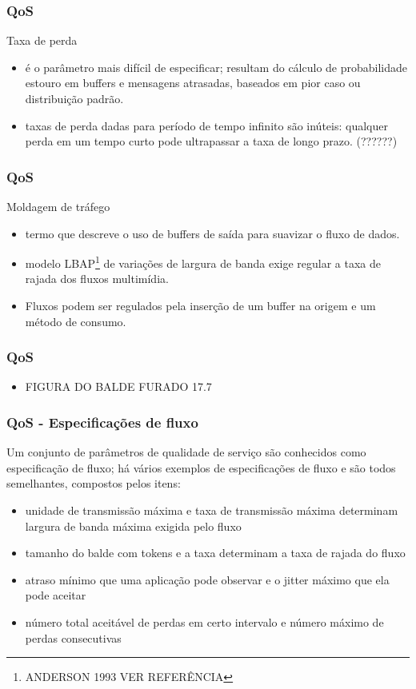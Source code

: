 \documentclass[]{beamer}
\begin{document}
\begin{frame}
  \frametitle{QoS}
Taxa de perda
\begin{itemize}
  \item é o parâmetro mais difícil de especificar; resultam do cálculo de probabilidade 
estouro em buffers e mensagens atrasadas, baseados em pior caso ou distribuição padrão.
  \item taxas de perda dadas para período de tempo infinito são inúteis: qualquer perda
em um tempo curto pode ultrapassar a taxa de longo prazo. (??????)
\end{itemize}
\end{frame}

\begin{frame}
  \frametitle{QoS}
Moldagem de tráfego
\begin{itemize}
  \item termo que descreve o uso de buffers de saída para suavizar o fluxo de dados.
  \item modelo LBAP\footnote{ANDERSON 1993 VER REFERÊNCIA} de variações de largura de banda 
exige regular a taxa de rajada dos fluxos multimídia.
  \item Fluxos podem ser regulados pela inserção de um buffer na origem e um método de 
consumo.
\end{itemize}
\end{frame}

\begin{frame}
  \frametitle{QoS}
\begin{itemize}
  \item FIGURA DO BALDE FURADO 17.7
\end{itemize}
\end{frame}

\begin{frame}
  \frametitle{QoS - Especificações de fluxo}
 Um conjunto de parâmetros de qualidade de serviço são conhecidos 
como especificação de fluxo; há vários exemplos de especificações de fluxo
e são todos semelhantes, compostos pelos itens:
  \begin{itemize}
   \item unidade de transmissão máxima e taxa de transmissão máxima determinam largura de 
banda máxima exigida pelo fluxo
   \item tamanho do balde com tokens e a taxa determinam a taxa de rajada do fluxo
   \item atraso mínimo que uma aplicação pode observar e o jitter máximo que ela
pode aceitar
   \item número total aceitável de perdas em certo intervalo e número máximo de perdas
consecutivas
  \end{itemize}
\end{frame}
\end{document}
